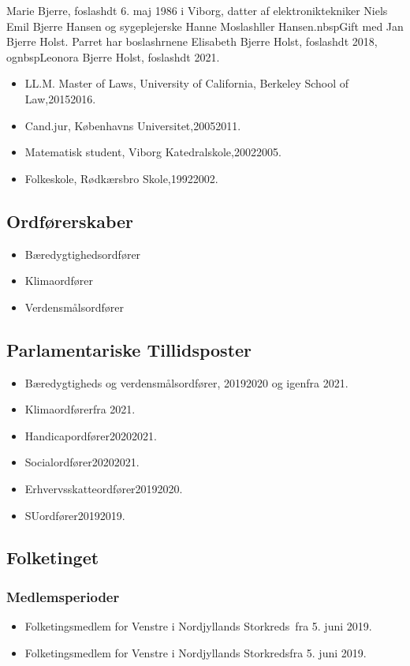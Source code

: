 \documentclass[11pt, a4paper]{awesome-cv}
\begin{document}
\makecvheader[R]
\makelettertitle
\begin{cvletter}
Marie Bjerre, foslashdt 6. maj 1986 i Viborg, datter af elektroniktekniker Niels Emil Bjerre Hansen og sygeplejerske Hanne Moslashller Hansen.nbspGift med Jan Bjerre Holst. Parret har boslashrnene Elisabeth Bjerre Holst, foslashdt 2018, ognbspLeonora Bjerre Holst, foslashdt 2021.

\begin{itemize}
\item LL.M. Master of Laws, University of California, Berkeley School of Law,20152016.
\item Cand.jur, Københavns Universitet,20052011.
\item Matematisk student, Viborg Katedralskole,20022005.
\item Folkeskole, Rødkærsbro Skole,19922002.
\end{itemize}
\subsection*{Ordførerskaber}
\begin{itemize}
\item Bæredygtighedsordfører
\item Klimaordfører
\item Verdensmålsordfører
\end{itemize}
\subsection*{Parlamentariske Tillidsposter}
\begin{itemize}
\item Bæredygtigheds og verdensmålsordfører, 20192020 og igenfra 2021.
\item Klimaordførerfra 2021.
\item Handicapordfører20202021.
\item Socialordfører20202021.
\item Erhvervsskatteordfører20192020.
\item SUordfører20192019.
\end{itemize}
\subsection*{Folketinget}
\subsubsection*{Medlemsperioder}
\begin{itemize}
\item Folketingsmedlem for Venstre i Nordjyllands Storkreds fra 5. juni 2019.
\item Folketingsmedlem for Venstre i Nordjyllands Storkredsfra 5. juni 2019.
\end{itemize}

\end{cvletter}
\end{document}
